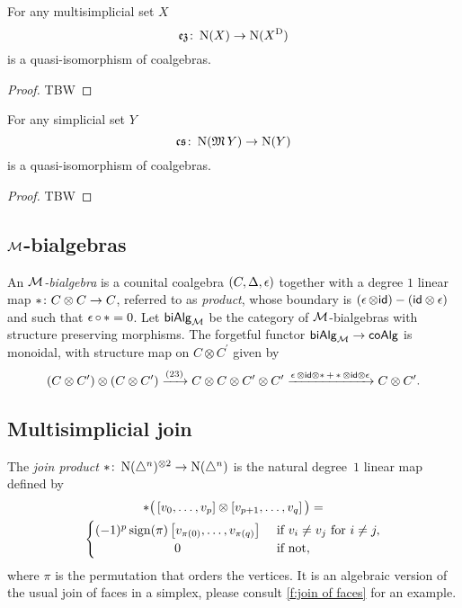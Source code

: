 \begin{theorem}
	For any multisimplicial set $X$
	\[
	\operatorname{\mathfrak{ez}} \colon \operatorname{N}(X) \to \operatorname{N}(X^{\mathrm{D}})
	\]
	is a quasi-isomorphism of coalgebras.
\end{theorem}

\begin{proof}
	TBW 
\end{proof}

\begin{theorem}
	For any simplicial set $Y$
	\[
	\operatorname{\mathfrak{cs}} \colon \operatorname{N}(\operatorname{\mathfrak{M}} Y) \to \operatorname{N}(Y)
	\]
	is a quasi-isomorphism of coalgebras.
\end{theorem}

\begin{proof}
	TBW 
\end{proof}

\subsection{$\mathcal{M}$-bialgebras}

An \textit{$\mathcal{M}$-bialgebra} is a counital coalgebra $(C, \operatorname{\Delta}, \operatorname{\epsilon})$ together with a degree $1$ linear map $\operatorname{\ast} \colon C \otimes C \to C$, referred to as \textit{product}, whose boundary is $(\operatorname{\epsilon} \otimes \mathsf{id}) - (\mathsf{id} \otimes \operatorname{\epsilon})$ and such that $\operatorname{\epsilon} \circ \operatorname{\ast} = 0$.
Let $\mathsf{biAlg}_{\mathcal{M}}$ be the category of $\mathcal{M}$-bialgebras with structure preserving morphisms.
The forgetful functor $\mathsf{biAlg}_{\mathcal{M}} \to \mathsf{coAlg}$ is monoidal, with structure map on $C \otimes C^\prime$ given by
\[
(C \otimes C^\prime) \otimes (C \otimes C^\prime) \xrightarrow{(23)}
C \otimes C \otimes C^\prime \otimes C^\prime
\xrightarrow{\operatorname{\epsilon} \otimes \mathsf{id} \otimes \operatorname{\ast} + \operatorname{\ast} \otimes \mathsf{id} \otimes \operatorname{\epsilon}}
C \otimes C^\prime.
\]

\subsection{Multisimplicial join}

The \textit{join product} $\ast \colon \operatorname{N}(\triangle^n)^{\otimes 2} \to \operatorname{N}(\triangle^n)$ is the natural degree~$1$ linear map defined by
\begin{multline}
\ast \big(\left[v_0, \dots, v_p \right] \ot \left[v_{p+1}, \dots, v_q\right]\big) = \\
\begin{cases} (-1)^{p} \sign(\pi) \left[v_{\pi(0)}, \dots, v_{\pi(q)}\right] & \text{ if } v_i \neq v_j \text{ for } i \neq j, \\
\hfil 0 & \text{ if not}, \end{cases}
\end{multline}
where $\pi$ is the permutation that orders the vertices.
It is an algebraic version of the usual join of faces in a simplex, please consult \cref{f:join of faces} for an example.

